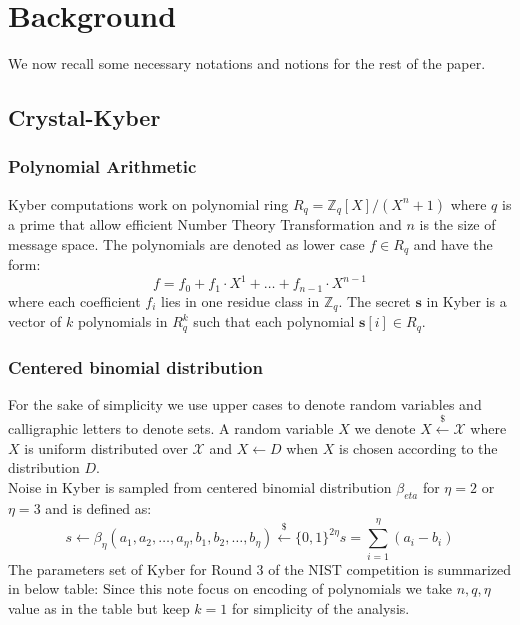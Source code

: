 \documentclass{llncs}
\begin{document}
\section{Background}
We now recall some necessary notations and notions for the rest of the paper.
\subsection*{Crystal-Kyber}
\subsubsection*{Polynomial Arithmetic}
Kyber computations work on polynomial ring $R_q = \mathbb{Z}_q[X]/(X^n + 1)$ where $q$ is a prime that allow efficient Number Theory Transformation and $n$ is the size of message space. 
The polynomials are denoted as lower case $f \in R_q$ and have the form:
\begin{equation}
	f = f_0 + f_1\cdot X^1 + \dots + f_{n-1}\cdot X^{n-1}
\end{equation}
where each coefficient $f_i$ lies in one residue class in $\mathbb{Z}_q$.
The secret $\mathbf{s}$ in Kyber is a vector of $k$ polynomials in $R^k_q$ such that each polynomial $\mathbf{s}[i] \in R_q$.
\subsubsection*{Centered binomial distribution}

For the sake of simplicity we use upper cases to denote random variables and calligraphic letters to denote sets.
A random variable $X$ we denote $X \overset{\$}{\leftarrow} \mathcal{X}$ where $X$ is uniform distributed over $\mathcal{X}$ and $X \leftarrow D$ when $X$ is chosen according to the distribution $D$.\\
Noise in Kyber is sampled from centered binomial distribution $\beta_{eta}$ for $\eta=2$ or $\eta=3$ and is defined as:
$$
s \leftarrow \beta_{\eta}
(a_1, a_2, \dots, a_{\eta}, b_1, b_2, \dots, b_{\eta}) \overset{\$}{\leftarrow} \{0, 1\}^{2\eta}
s = \sum_{i=1}^{\eta}(a_i-b_i)
$$
The parameters set of Kyber for Round 3 of the NIST competition is summarized in below table:
Since this note focus on encoding of polynomials we take $n, q, \eta$ value as in the table but keep $k=1$ for simplicity of the analysis.
\end{document}
